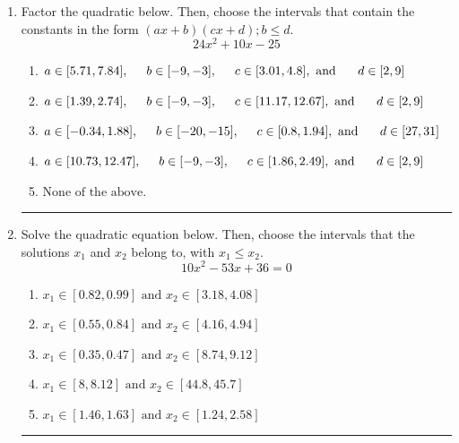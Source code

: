 \documentclass[14pt]{extbook}
\newcommand{\litem}[1]{\item#1\hspace*{-1cm}\rule{\textwidth}{0.4pt}}
\begin{document}
\begin{enumerate}
{\begin{enumerate}[label=\Alph*.]
\end{enumerate} }
\litem{
Factor the quadratic below. Then, choose the intervals that contain the constants in the form $(ax+b)(cx+d); b \leq d.$\[ 24x^{2} +10 x -25 \]\begin{enumerate}[label=\Alph*.]
\item \( a \in [5.71, 7.84], \hspace*{5mm} b \in [-9, -3], \hspace*{5mm} c \in [3.01, 4.8], \text{ and } \hspace*{5mm} d \in [2, 9] \)
\item \( a \in [1.39, 2.74], \hspace*{5mm} b \in [-9, -3], \hspace*{5mm} c \in [11.17, 12.67], \text{ and } \hspace*{5mm} d \in [2, 9] \)
\item \( a \in [-0.34, 1.88], \hspace*{5mm} b \in [-20, -15], \hspace*{5mm} c \in [0.8, 1.94], \text{ and } \hspace*{5mm} d \in [27, 31] \)
\item \( a \in [10.73, 12.47], \hspace*{5mm} b \in [-9, -3], \hspace*{5mm} c \in [1.86, 2.49], \text{ and } \hspace*{5mm} d \in [2, 9] \)
\item \( \text{None of the above.} \)

\end{enumerate} }
\litem{
Solve the quadratic equation below. Then, choose the intervals that the solutions $x_1$ and $x_2$ belong to, with $x_1 \leq x_2$.\[ 10x^{2} -53 x + 36 = 0 \]\begin{enumerate}[label=\Alph*.]
\item \( x_1 \in [0.82, 0.99] \text{ and } x_2 \in [3.18, 4.08] \)
\item \( x_1 \in [0.55, 0.84] \text{ and } x_2 \in [4.16, 4.94] \)
\item \( x_1 \in [0.35, 0.47] \text{ and } x_2 \in [8.74, 9.12] \)
\item \( x_1 \in [8, 8.12] \text{ and } x_2 \in [44.8, 45.7] \)
\item \( x_1 \in [1.46, 1.63] \text{ and } x_2 \in [1.24, 2.58] \)


\end{enumerate}}
\end{enumerate}
\end{document}
